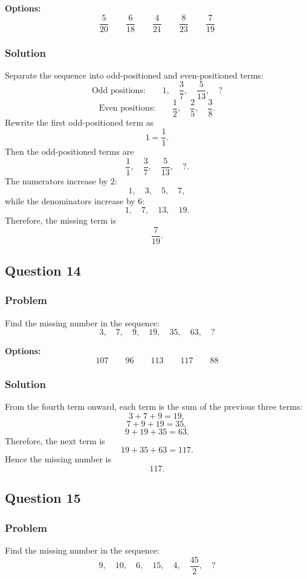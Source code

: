 \documentclass[12pt]{article}
\begin{document}
\noindent\textbf{Options:}
\[
\boxed{\frac{5}{20}}
\qquad
\boxed{\frac{6}{18}}
\qquad
\boxed{\frac{4}{21}}
\qquad
\boxed{\frac{8}{23}}
\qquad
\boxed{\frac{7}{19}}
\]

\subsubsection{Solution}
Separate the sequence into odd-positioned and even-positioned terms:
\[
\text{Odd positions:}\qquad 1,\quad \frac{3}{7},\quad \frac{5}{13},\quad ?
\]
\[
\text{Even positions:}\qquad \frac{1}{2},\quad \frac{2}{5},\quad \frac{3}{8}.
\]
Rewrite the first odd-positioned term as
\[
1=\frac{1}{1}.
\]
Then the odd-positioned terms are
\[
\frac{1}{1},\quad \frac{3}{7},\quad \frac{5}{13},\quad ?.
\]
The numerators increase by \(2\):
\[
1,\quad 3,\quad 5,\quad 7,
\]
while the denominators increase by \(6\):
\[
1,\quad 7,\quad 13,\quad 19.
\]
Therefore, the missing term is
\[
\boxed{\frac{7}{19}}.
\]

\subsection{Question 14}
\subsubsection{Problem}
Find the missing number in the sequence:
\[
3,\quad 7,\quad 9,\quad 19,\quad 35,\quad 63,\quad ?
\]

\noindent\textbf{Options:}
\[
\boxed{107}
\qquad
\boxed{96}
\qquad
\boxed{113}
\qquad
\boxed{117}
\qquad
\boxed{88}
\]

\subsubsection{Solution}
From the fourth term onward, each term is the sum of the previous three terms:
\[
3+7+9=19,
\]
\[
7+9+19=35,
\]
\[
9+19+35=63.
\]
Therefore, the next term is
\[
19+35+63=117.
\]
Hence the missing number is
\[
\boxed{117}.
\]

\subsection{Question 15}
\subsubsection{Problem}
Find the missing number in the sequence:
\[
9,\quad 10,\quad 6,\quad 15,\quad 4,\quad \frac{45}{2},\quad ?
\]
\end{document}
